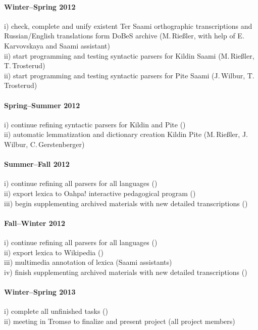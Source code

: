 \documentclass[a4paper,12pt]{article}
\begin{document}
{{{{\paragraph{Winter–Spring 2012}
i) check, complete and unify existent Ter Saami orthographic transcriptions and Russian/English translations form DoBeS archive (M.\,Rießler, with help of E.\,Karvovskaya and Saami assistant)\\
ii) start programming and testing syntactic parsers for Kildin Saami (M.\,Rießler, T.\,Trosterud)\\
ii) start programming and testing syntactic parsers for Pite Saami (J.\,Wilbur, T.\,Trosterud)

\paragraph{Spring–Summer 2012}
i) continue refining syntactic parsers for Kildin and Pite ()\\
ii) automatic lemmatization and dictionary creation Kildin Pite (M.\,Rießler, J.\,Wilbur, C.\,Gerstenberger)

\paragraph{Summer–Fall 2012}
i) continue refining all parsers for all languages ()\\
ii) export lexica to Oahpa! interactive pedagogical program ()\\
iii) begin supplementing archived materials with new detailed transcriptions ()

\paragraph{Fall–Winter 2012}
i) continue refining all parsers for all languages ()\\
ii) export lexica to Wikipedia ()\\
iii) multimedia annotation of lexica (Saami assistants)\\
iv) finish supplementing archived materials with new detailed transcriptions ()

\paragraph{Winter–Spring 2013}
i) complete all unfinished tasks ()\\
ii) meeting in Tromsø to finalize and present project (all project members)




}}}}
\end{document}
